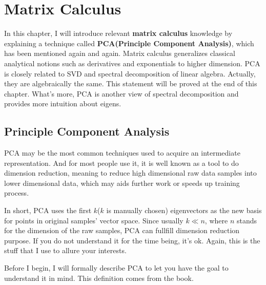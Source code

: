 \documentclass[a4paper]{book}
\begin{document}
\chapter{Matrix Calculus}
\label{chp:matrix_calculus}
In this chapter, I will introduce relevant \textbf{matrix calculus}
knowledge by explaining a technique called \textbf{PCA(Principle
  Component Analysis)}, which has been mentioned again and again.
Matrix calculus generalizes classical analytical notions such as
derivatives and exponentials to higher dimension. PCA is closely
related to SVD and spectral decomposition of linear algebra.  Actually, they
are algebraically the same. This statement will be proved at the end
of this chapter.  What's more, PCA is another view of spectral decomposition
and provides more intuition about eigens.

  \section{Principle Component Analysis}


  PCA may be the most common techniques used to acquire an intermediate
  representation. And for most people use it, it is well known as a tool
  to do dimension reduction, meaning to reduce high dimensional raw data
  samples into lower dimensional data, which may aids further work or
  speeds up training process.

  In short, PCA uses the first $k$($k$ is manually chosen) eigenvectors
  as the new basis for points in original samples' vector space. Since
  usually $k \ll n$, where $n$ stands for the dimension of the raw
  samples, PCA can fullfill dimension reduction purpose. If you do not
  understand it for the time being, it's ok. Again, this is the stuff
  that I use to allure your interests.

  Before I begin, I will formally describe PCA to let you have the goal
  to understand it in mind. This definition comes from the book\cite{murphy2012machine}.
\end{document}
